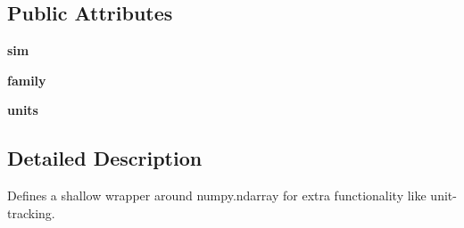 \subsection*{Public Attributes}
\begin{DoxyCompactItemize}
\item 
\hypertarget{classseren3_1_1array_1_1SimArray_ae1da840fce139a03141462afa86c2541}{
{\bfseries sim}}
\label{classseren3_1_1array_1_1SimArray_ae1da840fce139a03141462afa86c2541}

\item 
\hypertarget{classseren3_1_1array_1_1SimArray_a4e83c543a4f52684bd2366d8b84d6f1a}{
{\bfseries family}}
\label{classseren3_1_1array_1_1SimArray_a4e83c543a4f52684bd2366d8b84d6f1a}

\item 
\hypertarget{classseren3_1_1array_1_1SimArray_a542b6411c8bc09bd1ea2ca80ff0a4ddc}{
{\bfseries units}}
\label{classseren3_1_1array_1_1SimArray_a542b6411c8bc09bd1ea2ca80ff0a4ddc}

\end{DoxyCompactItemize}


\subsection{Detailed Description}
\begin{DoxyVerb}
Defines a shallow wrapper around numpy.ndarray for extra
functionality like unit-tracking.
\end{DoxyVerb}
 

